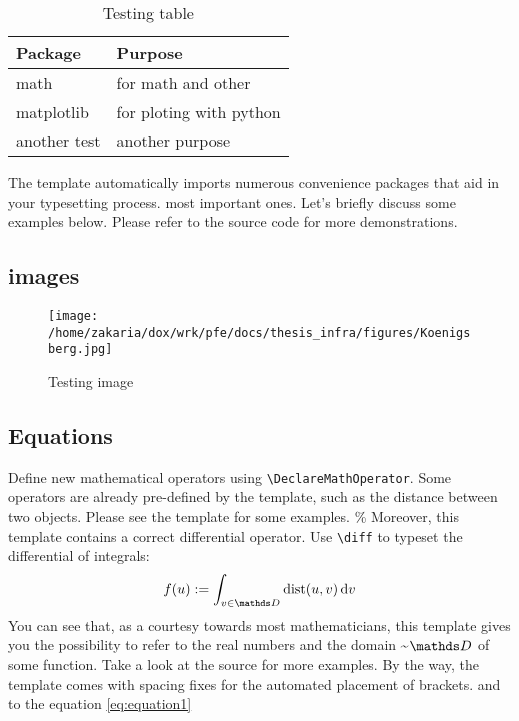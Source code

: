 \documentclass{mimosis}
\numberwithin{equation}{chapter}
\numberwithin{listing}{chapter}
\begin{document}
\begin{table}[htbp]
\caption{\label{table1}Testing table}
\centering
\begin{tabular}{ll}
\toprule
\textbf{Package} & \textbf{Purpose}\\
\midrule
math & for math and other\\
matplotlib & for ploting with python\\
another test & another purpose\\
\bottomrule
\end{tabular}
\end{table}
The template automatically imports numerous convenience packages that
aid in your typesetting process.
most important ones. Let's briefly discuss some examples below. Please
refer to the source code for more demonstrations.
\subsection{images}
\label{sec:orgdc8b4fc}
\begin{figure}[htbp]
\centering
\texttt{[image: /home/zakaria/dox/wrk/pfe/docs/thesis\_infra/figures/Koenigsberg.jpg]}
\caption{\label{fig:myfig1}Testing image}
\end{figure}
\subsection{Equations}
\label{sec:orgc490e0d}
Define new mathematical operators using \verb|\DeclareMathOperator|.
Some operators are already pre-defined by the template, such as the
distance between two objects. Please see the template for some examples. 
\%
Moreover, this template contains a correct differential operator. Use \verb|\diff| to typeset the differential of integrals:
\begin{equation}\label{eq:equation1}
  f(u) := \int_{v \in \domain}\dist(u,v)\diff{v}
\end{equation}
You can see that, as a courtesy towards most mathematicians, this
template gives you the possibility to refer to the real numbers 
and the domain \textasciitilde{}\(\domain\) of some function. Take a look at the source for
more examples. By the way, the template comes with spacing fixes for the
automated placement of brackets.
and to the equation \eqref{eq:equation1}


\backmatter
\begingroup
    \let\clearpage\relax
    \glsaddall
    \printglossary[type=\acronymtype]
    \newpage
    \printglossary
\endgroup
\printindex

\appendix
\printbibliography
\end{document}
